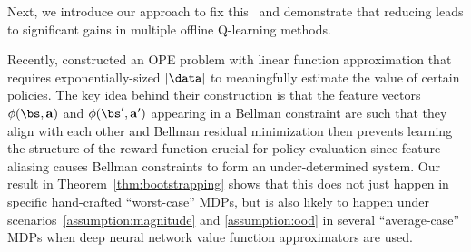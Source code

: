 Next, we introduce our approach to fix this \aliasingproblemname\ and demonstrate that reducing \aliasingproblemname leads to significant gains in multiple offline Q-learning methods. %

\begin{remark}
Recently, \citet{zanette2020exponential} constructed an OPE problem with linear function approximation that requires exponentially-sized $|\data|$ to meaningfully estimate the value of certain policies. The key idea behind their construction is that the feature vectors $\phi(\bs, \mathbf{a})$ and $\phi(\bs', \mathbf{a}')$ appearing in a Bellman constraint are such that they align with each other and Bellman residual minimization then prevents learning the structure of the reward function crucial for policy evaluation since feature aliasing causes Bellman constraints to form an under-determined system. Our result in Theorem~\ref{thm:bootstrapping} shows that this does not just happen in specific hand-crafted ``worst-case'' MDPs, but is also likely to happen under scenarios~\ref{assumption:magnitude} and \ref{assumption:ood} in several ``average-case'' MDPs when deep neural network value function approximators are used.
\end{remark}



